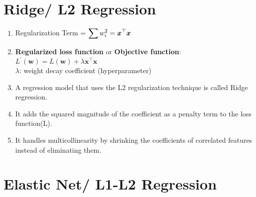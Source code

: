\section{Ridge/ L2 Regression}

\begin{enumerate}
    \item Regularization Term = $ \displaystyle\sum w_i^2 = \bm{x}^\top\bm{x}$
    \hfill \cite{geeksforgeeks/machine-learning/regularization-in-machine-learning}

    \item \textbf{Regularized loss function} or \textbf{Objective function}:
    $
        L^\prime (\bm{w}) = L (\bm{w}) + \lambda \bm{x}^\top\bm{x}
    $
    \\
    $\lambda$: weight decay coefficient (hyperparameter)
    
    \item A regression model that uses the L2 regularization technique is called Ridge regression. 
    \hfill \cite{geeksforgeeks/machine-learning/regularization-in-machine-learning}
    
    \item It adds the squared magnitude of the coefficient as a penalty term to the loss function(L). 
    \hfill \cite{geeksforgeeks/machine-learning/regularization-in-machine-learning}
    
    \item It handles multicollinearity by shrinking the coefficients of correlated features instead of eliminating them.
    \hfill \cite{geeksforgeeks/machine-learning/regularization-in-machine-learning}
\end{enumerate}




\section{Elastic Net/ L1-L2 Regression}

